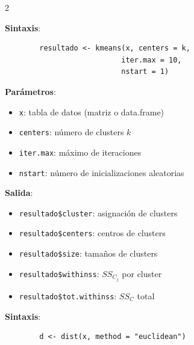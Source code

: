 \documentclass[10pt,a4paper]{article}
\begin{document}

\begin{multicols}{2}
    \begin{tcolorbox}[title=kmeans(): k-medias, equal height group=CL5]
        \textbf{Sintaxis}:
        \begin{verbatim}
        resultado <- kmeans(x, centers = k, 
                           iter.max = 10, 
                           nstart = 1)
        \end{verbatim}
        
        \textbf{Parámetros}:
        \begin{itemize}
            \item \texttt{x}: tabla de datos (matriz o data.frame)
            \item \texttt{centers}: número de clusters $k$
            \item \texttt{iter.max}: máximo de iteraciones
            \item \texttt{nstart}: número de inicializaciones aleatorias
        \end{itemize}
        
        \textbf{Salida}:
        \begin{itemize}
            \item \texttt{resultado\$cluster}: asignación de clusters
            \item \texttt{resultado\$centers}: centros de clusters
            \item \texttt{resultado\$size}: tamaños de clusters
            \item \texttt{resultado\$withinss}: $SS_{C_j}$ por cluster
            \item \texttt{resultado\$tot.withinss}: $SS_C$ total
        \end{itemize}
    \end{tcolorbox}
    \begin{tcolorbox}[title=dist(): Matriz de Distancias, equal height group=CL5]
        \textbf{Sintaxis}:
        \begin{verbatim}
        d <- dist(x, method = "euclidean")
        \end{verbatim}
        

\end{tcolorbox}
\end{multicols}
\end{document}
